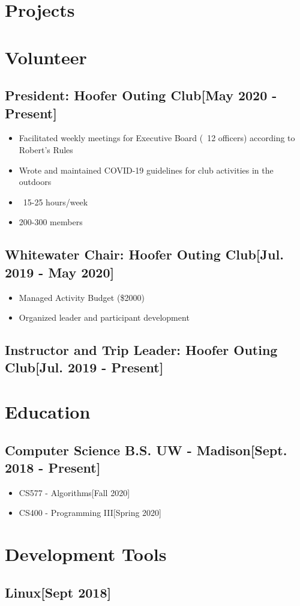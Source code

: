\documentclass{article}
\begin{document}
\section{Projects}

\section{Volunteer}

    \subsection{\textbf{President}: Hoofer Outing Club\hfill[May 2020 - Present]}
        \begin{itemize}
            \item Facilitated weekly meetings for Executive Board (~12 officers) according to Robert's Rules
            \item Wrote and maintained COVID-19 guidelines for club activities in the outdoors
            \item ~15-25 hours/week
            \item 200-300 members
        \end{itemize}

    \subsection{\textbf{Whitewater Chair}: Hoofer Outing Club\hfill[Jul. 2019 - May 2020]}
        \begin{itemize}
            \item Managed Activity Budget (\$2000)
            \item Organized leader and participant development
        \end{itemize}

    \subsection{\textbf{Instructor and Trip Leader}: Hoofer Outing Club\hfill[Jul. 2019 - Present]}

\section{Education}

    \subsection{\textbf{Computer Science B.S.} UW - Madison\hfill[Sept. 2018 - Present]}
        \begin{itemize}
            \item CS577 - Algorithms\hfill[Fall 2020]
            \item CS400 - Programming III\hfill[Spring 2020]
        \end{itemize}

\section{Development Tools}

    \subsection{Linux\hfill[Sept 2018]}
\end{document}
